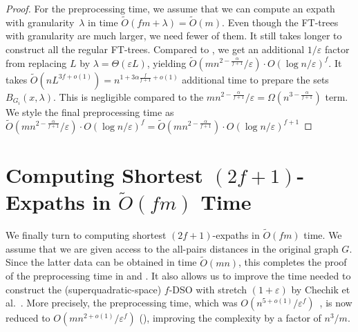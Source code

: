 \documentclass{article}\usepackage[a4paper,margin=20mm]{geometry}
\newcommand*{\Otilde}{\widetilde{O}}
\newcommand{\eps}{\varepsilon}
\begin{document}
\begin{proof}
	For the preprocessing time, we assume that we can compute an expath with granularity~$\lambda$
	in time $\Otilde(fm + \lambda) = \Otilde(m)$.
	Even though the FT-trees with granularity are much larger, we need fewer of them.
	It still takes longer to construct all the regular FT-trees.
	Compared to , we get an additional $1/\varepsilon$
	factor from replacing $L$ by $\lambda = \Theta(\varepsilon L)$,
	yielding 
	$\Otilde(mn^{2-\frac{\alpha}{f+1}}/\varepsilon)
  	\cdot O(\log n/\varepsilon)^{f}$.
	It takes $\Otilde(nL^{3f+o(1)}) = n^{1+3\alpha \frac{f}{f+1}+o(1)}$ additional time
	to prepare the sets $B_{G_i}(x,\lambda)$.
	This is negligible compared to the 
	$mn^{2-\frac{\alpha}{f+1}}/\varepsilon = \Omega(n^{3-\frac{\alpha}{f+1}})$ term.
	We style the final preprocessing time as 
	$\Otilde(mn^{2-\frac{\alpha}{f+1}}/\varepsilon)
  	\cdot O(\log n/\varepsilon)^{f} =  	
  	\Otilde(mn^{2-\frac{\alpha}{f+1}})
  	\cdot O(\log n/\varepsilon)^{f+1}$
\end{proof}


\section{Computing Shortest \texorpdfstring{$(2f{+}1)$}{(2f+1)}-Expaths in \texorpdfstring{$\Otilde(fm)$}{Õ(fm)} Time}
\label{sec:improved_preproc} 

We finally turn to computing shortest $(2f{+}1)$-expaths in $\Otilde(fm)$ time.
We assume that we are given access to the all-pairs distances in the original graph $G$.
Since the latter data can be obtained in time $\Otilde(mn)$, this completes the proof of the preprocessing time in
 and .
It also allows us to improve the time needed to construct the (superquadratic-space) $f$-DSO with stretch $(1+\eps)$ by Chechik et al.~\cite{ChCoFiKa17}.
More precisely, the preprocessing time, which was $O(n^{5+o(1)}/\varepsilon^f)$~\cite{ChCoFiKa17},
is now reduced to $O(mn^{2+o(1)}/\varepsilon^f)$ (),
improving the complexity by a factor of $n^3/m$.
\end{document}
